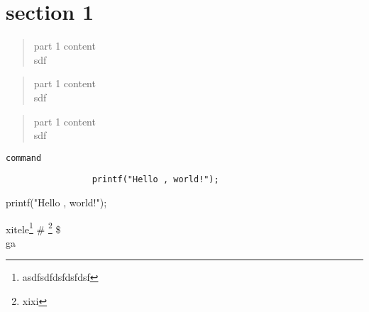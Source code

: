 \documentclass[12pt]{article}
\begin{document}
        \section{section 1}
             \begin{quote}  %
                part 1 content \\ sdf
             \end{quote}           
             \begin{quotation}
                part 1 content \\ sdf   %
             \end{quotation}   
             \begin{verse}
                part 1 content \\ sdf   %
             \end{verse}   
            
             \verb|command| %
             \begin{verbatim}  
                 printf("Hello , world!");
             \end{verbatim}
             \begin{verbatim*}
                printf("Hello , world!");
             \end{verbatim*}
             
            \renewcommand{\thefootnote}{\Roman{footnote}} %
             xitele\footnote{asdfsdfdsfdsfdsf}  %
            \# \footnote{xixi}
            \$ \reversemarginpar {} %
            \\
            \normalmarginpar
            ga 
            
            \begin{comment}
            水电费第三方
            水电费
            \end{comment}
\end{document}
